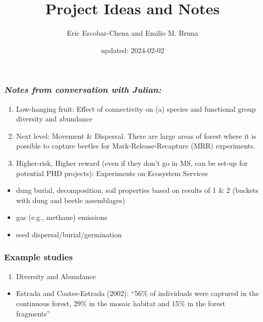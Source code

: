 \documentclass[
  12pt,
]{article}
\title{Project Ideas and Notes}
\author{Eric Escobar-Chena and Emilio M. Bruna}
\date{updated: 2024-02-02}
\providecommand{\tightlist}{%
  \setlength{\itemsep}{0pt}\setlength{\parskip}{0pt}}
\begin{document}
\maketitle

\hypertarget{notes-from-conversation-with-julian}{%
\subsubsection{\texorpdfstring{\emph{Notes from conversation with
Julian:}}{Notes from conversation with Julian:}}\label{notes-from-conversation-with-julian}}

\begin{enumerate}
\def\labelenumi{\arabic{enumi}.}
\tightlist
\item
  Low-hanging fruit: Effect of connectivity on (a) species and
  functional group diversity and abundance
\item
  Next level: Movement \& Dispersal. There are large areas of forest
  where it is possible to capture beetles for Mark-Release-Recapture
  (MRR) experiments.
\item
  Higher-risk, Higher reward (even if they don't go in MS, can be set-up
  for potential PHD projects): Experiments on Ecosystem Services
\end{enumerate}

\begin{itemize}
\tightlist
\item
  dung burial, decomposition, soil properties based on results of 1 \& 2
  (buckets with dung and beetle assemblages)
\item
  gas (e.g., methane) emissions
\item
  seed dispersal/burial/germination
\end{itemize}

\hypertarget{example-studies}{%
\subsubsection{Example studies}\label{example-studies}}

\begin{enumerate}
\def\labelenumi{\arabic{enumi}.}
\tightlist
\item
  Diversity and Abundance
\end{enumerate}

\begin{itemize}
\tightlist
\item
  Estrada and Coates-Estrada (2002): ``56\% of individuals were captured
  in the continuous forest, 29\% in the mosaic habitat and 15\% in the
  forest fragments''
\end{itemize}
\end{document}
